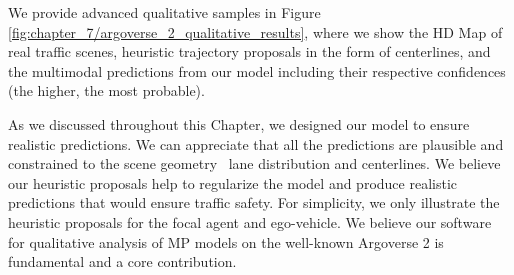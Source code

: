 We provide advanced qualitative samples in Figure \ref{fig:chapter_7/argoverse_2_qualitative_results}, where we show the HD Map of real traffic scenes, heuristic trajectory proposals in the form of centerlines, and the multimodal predictions from our model including their respective confidences (the higher, the most probable). 

As we discussed throughout this Chapter, we designed our model to ensure realistic predictions. We can appreciate that all the predictions are plausible and constrained to the scene geometry \eg \ lane distribution and centerlines. We believe our heuristic proposals help to regularize the model and produce realistic predictions that would ensure traffic safety. For simplicity, we only illustrate the heuristic proposals for the focal agent and ego-vehicle. We believe our software for qualitative analysis of MP models on the well-known Argoverse 2 \cite{wilson2023argoverse} is fundamental and a core contribution.

